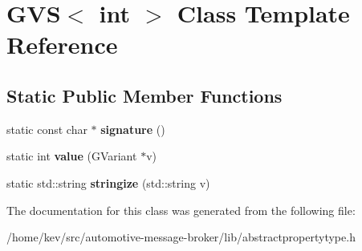 \hypertarget{classGVS_3_01int_01_4}{\section{G\+V\+S$<$ int $>$ Class Template Reference}
\label{classGVS_3_01int_01_4}
}
\subsection*{Static Public Member Functions}
\begin{DoxyCompactItemize}
\item 
\hypertarget{classGVS_3_01int_01_4_aac00b94bc9b614c9adafdecc671b895e}{static const char $\ast$ {\bfseries signature} ()}\label{classGVS_3_01int_01_4_aac00b94bc9b614c9adafdecc671b895e}

\item 
\hypertarget{classGVS_3_01int_01_4_af57dd531535ceb741c65a90520aba578}{static int {\bfseries value} (G\+Variant $\ast$v)}\label{classGVS_3_01int_01_4_af57dd531535ceb741c65a90520aba578}

\item 
\hypertarget{classGVS_3_01int_01_4_ac284bb5efd7dc2bb3f641c94317a3385}{static std\+::string {\bfseries stringize} (std\+::string v)}\label{classGVS_3_01int_01_4_ac284bb5efd7dc2bb3f641c94317a3385}

\end{DoxyCompactItemize}


The documentation for this class was generated from the following file\+:\begin{DoxyCompactItemize}
\item 
/home/kev/src/automotive-\/message-\/broker/lib/abstractpropertytype.\+h\end{DoxyCompactItemize}
